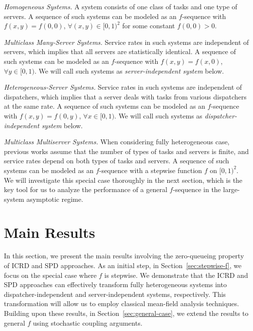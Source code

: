 \documentclass[11pt, reqno]{article}
\numberwithin{equation}{section}
\numberwithin{theorem}{section}
\begin{document}
\begin{enumerate}[{[a]}]
    \item \textit{Homogeneous Systems.} A system consists of one class of tasks and one type of servers. A sequence of such systems can be modeled as an $f$-sequence with $f(x,y)=f(0,0)$, $\forall (x,y)\in[0,1)^2$ for some constant $f(0,0)>0$.

    \item \textit{Multiclass Many-Server Systems.} Service rates in such systems are independent of servers, which implies that all servers are statistically identical. A sequence of such systems can be modeled as an $f$-sequence with $f(x,y)=f(x,0)$, $\forall y\in[0,1)$. We will call such systems as \textit{server-independent system} below.

    \item \textit{Heterogeneous-Server Systems.} Service rates in such systems are independent of dispatchers, which implies that a server deals with tasks from various dispatchers at the same rate. A sequence of such systems can be modeled as an $f$-sequence with $f(x,y)=f(0,y)$, $\forall x\in[0,1)$. We will call such systems as \textit{dispatcher-independent system} below.

    \item \textit{Multiclass Multiserver Systems.} When considering fully heterogeneous case, previous works assume that the number of types of tasks and servers is finite, and service rates depend on both types of tasks and servers. A sequence of such systems can be modeled as an $f$-sequence with a stepwise function $f$ on $[0,1)^2$. We will investigate this special case thoroughly in the next section, which is the key tool for us to analyze the performance of a general $f$-sequence in the large-system asymptotic regime.
\end{enumerate}

\section{Main Results}
In this section, we present the main results involving the zero-queueing property of ICRD and SPD approaches. 
As an initial step, in Section~\ref{sec:stepwise-f}, we focus on the special case where $f$ is stepwise. We demonstrate that the ICRD and SPD approaches can effectively transform fully heterogeneous systems into dispatcher-independent and server-independent systems, respectively. This transformation will allow us to employ classical mean-field analysis techniques. 
Building upon these results, in Section~\ref{sec:general-case}, we extend the results to general $f$ using stochastic coupling arguments.
\end{document}
